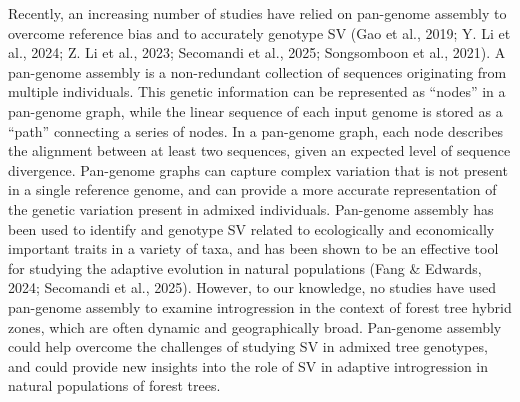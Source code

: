 \documentclass[
]{agujournal2019}
\begin{document}
Recently, an increasing number of studies have relied on pan-genome
assembly to overcome reference bias and to accurately genotype SV (Gao
et al., 2019; Y. Li et al., 2024; Z. Li et al., 2023; Secomandi et al.,
2025; Songsomboon et al., 2021). A pan-genome assembly is a
non-redundant collection of sequences originating from multiple
individuals. This genetic information can be represented as ``nodes'' in
a pan-genome graph, while the linear sequence of each input genome is
stored as a ``path'' connecting a series of nodes. In a pan-genome
graph, each node describes the alignment between at least two sequences,
given an expected level of sequence divergence. Pan-genome graphs can
capture complex variation that is not present in a single reference
genome, and can provide a more accurate representation of the genetic
variation present in admixed individuals. Pan-genome assembly has been
used to identify and genotype SV related to ecologically and
economically important traits in a variety of taxa, and has been shown
to be an effective tool for studying the adaptive evolution in natural
populations (Fang \& Edwards, 2024; Secomandi et al., 2025). However, to
our knowledge, no studies have used pan-genome assembly to examine
introgression in the context of forest tree hybrid zones, which are
often dynamic and geographically broad. Pan-genome assembly could help
overcome the challenges of studying SV in admixed tree genotypes, and
could provide new insights into the role of SV in adaptive introgression
in natural populations of forest trees.
\end{document}
